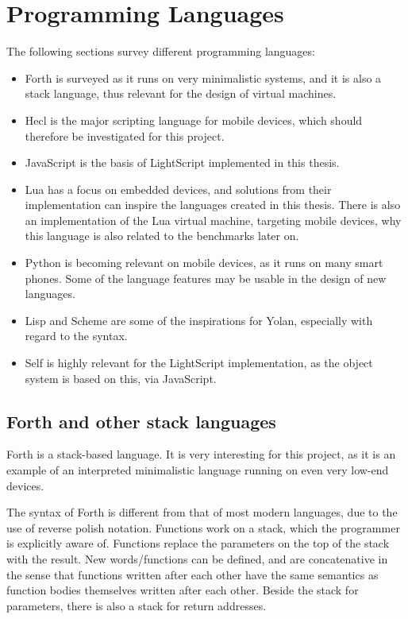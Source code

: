 \documentclass[11pt]{report}
\begin{document}
\section{Programming Languages}
The following sections survey different programming languages:
\begin{itemize}
\item Forth is surveyed as it runs on very minimalistic systems, and it is also a stack language, thus relevant for the design of virtual machines. 
\item Hecl is the major scripting language for mobile devices, which should therefore be investigated for this project.
\item JavaScript is the basis of LightScript implemented in this thesis.
\item Lua has a focus on embedded devices, and solutions from their implementation can inspire the languages created in this thesis. There is also an implementation of the Lua virtual machine, targeting mobile devices, why this language is also related to the benchmarks later on.
\item Python is becoming relevant on mobile devices, as it runs on many smart phones. Some of the language features may be usable in the design of new languages.
\item Lisp and Scheme are some of the inspirations for Yolan, especially with regard to the syntax. 
\item Self is highly relevant for the LightScript implementation, as the object system is based on this, via JavaScript.
\end{itemize}


\subsection{Forth and other stack languages}
Forth is a stack-based language.
It is very interesting for this project, as it is an example of an interpreted minimalistic language running on even very low-end devices.

The syntax of Forth is different from that of most modern languages, due to the use of reverse polish notation.
Functions work on a stack, which the programmer is explicitly aware of. 
Functions replace the parameters on the top of the stack with the result. 
New words/functions can be defined, and are concatenative in the sense that functions written after each other have the same semantics as function bodies themselves written after each other.
Beside the stack for parameters, there is also a stack for return addresses.
\end{document}
